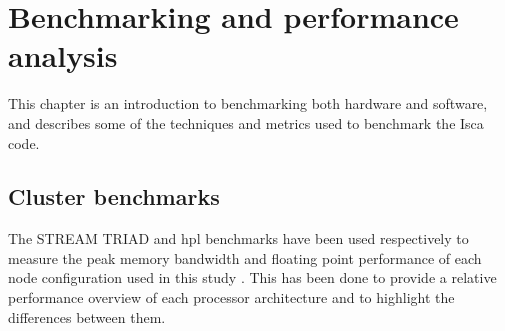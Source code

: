 \documentclass[a4paper,11pt]{report}
\begin{document}
\chapter{Benchmarking and performance analysis}
This chapter is an introduction to benchmarking both hardware and software, and describes some of the techniques and metrics used to benchmark the Isca code. 
\section{Cluster benchmarks}
\label{sec:cluster-bench}
The STREAM TRIAD and \gls{hpl} benchmarks have been used respectively to measure the peak memory bandwidth and floating point performance of each node configuration used in this study \cite{mccalpin1995memory,dongarra2008linpack}. This has been done to provide a relative performance overview of each processor architecture and to highlight the differences between them. 
\end{document}
